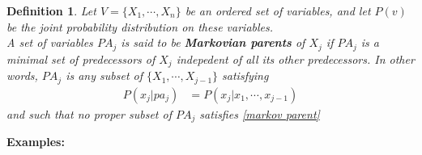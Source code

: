 \documentclass{article}
\newtheorem{definition}{Definition}[section]
\begin{document}
    \begin{definition}
        \label{parent def}
        Let $V=\{X_1,\cdots,X_n\}$ be an ordered set of variables, and let $P(v)$ be the joint probability distribution on these variables.
        \\ A set of variables $PA_j$ is said to be \textbf{Markovian parents} of $X_j$  if $PA_j$ is a minimal set of predecessors of $X_j$ indepedent of all its other predecessors. In other words, $PA_j$ is any subset of $\{X_1,\cdots,X_{j-1}\}$ satisfying
        \begin{align}
            \label{markov parent}
            P(x_j|pa_j)&=P(x_j|x_1,\cdots,x_{j-1})
        \end{align}
        and such that no proper subset of $PA_j$ satisfies \cref{markov parent}
    \end{definition}
    \textbf{Examples:}\\
\end{document}
